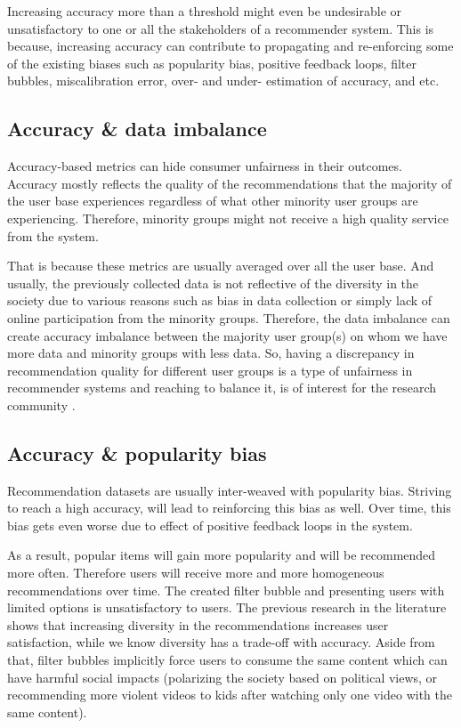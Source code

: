 Increasing accuracy more than a threshold might even be undesirable or unsatisfactory to one or all the stakeholders of a recommender system. This is because, increasing accuracy can contribute to propagating and re-enforcing some of the existing biases such as popularity bias, positive feedback loops, filter bubbles, miscalibration error, over- and under- estimation of accuracy, and etc. 


\subsection{Accuracy \& data imbalance}
Accuracy-based metrics can hide consumer unfairness in their outcomes. Accuracy mostly reflects the quality of the recommendations that the majority of the user base experiences regardless of what other minority user groups are experiencing. Therefore, minority groups might not receive a high quality service from the system. 

That is because these metrics are usually averaged over all the user base. And usually, the previously collected data is not reflective of the diversity in the society due to various reasons such as bias in data collection or simply lack of online participation from the minority groups. Therefore, the data imbalance can create accuracy imbalance between the majority user group(s) on whom we have more data and minority groups with less data. So, having a discrepancy in recommendation quality for different user groups is a type of unfairness  in recommender systems and reaching to balance it, is of interest for the research community .


\subsection{Accuracy \& popularity bias}
Recommendation datasets are usually inter-weaved with popularity bias. Striving to reach a high accuracy, will lead to reinforcing this bias as well. Over time, this bias gets even worse due to effect of positive feedback loops in the system.

As a result, popular items will gain more popularity and will be recommended more often. 
Therefore users will receive more and more homogeneous recommendations over time. The created filter bubble and presenting users with limited options is unsatisfactory to users. The previous research in the literature shows that increasing diversity in the recommendations increases user satisfaction, while we know diversity has a trade-off with accuracy. Aside from that, filter bubbles implicitly force users to consume the same content which can have harmful social impacts (polarizing the society based on political views, or recommending more violent videos to kids after watching only one video with the same content). 

